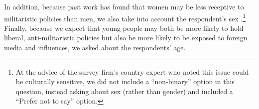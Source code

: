 In addition, because past work has found that women may be less receptive to militaristic policies than men, we also take into account the respondent's sex \cite{allen2020,allen2023}.\footnote{At the advice of the survey firm's country expert who noted this issue could be culturally sensitive, we did not include a ``non-binary'' option in this question, instead asking about sex (rather than gender) and included a ``Prefer not to say'' option.} Finally, because we expect that young people may both be more likely to hold liberal, anti-militaristic policies but also be more likely to be exposed to foreign media and influences, we asked about the respondents' age. 



